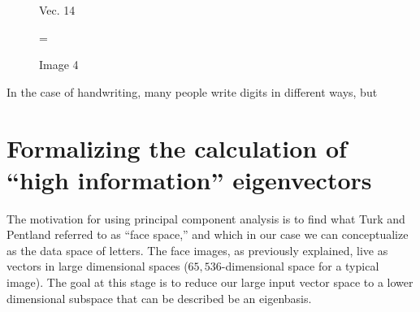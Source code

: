 \documentclass[12pt]{report}
\begin{document}
\begin{figure}[H]
                \begin{minipage}{0.1\textwidth}
                    \centering
                    Vec. 14
                \end{minipage}
                \begin{minipage}{0.035\textwidth}
                    \centering
                    \quad=\quad
                \end{minipage}
                \begin{minipage}{0.1\textwidth}
                    \centering
                    Image 4
                \end{minipage}%
            \end{figure}

            In the case of handwriting, many people write digits in different ways, but 
                
        
        \section{Formalizing the calculation of ``high information'' eigenvectors}
            The motivation for using principal component analysis is to find what Turk and Pentland referred to as ``face space,'' and which in our case we can conceptualize as the data space of letters. The face images, as previously explained, live as vectors in large dimensional spaces ($65,536$-dimensional  space for a typical image). The goal at this stage is to reduce our large input vector space to a lower dimensional subspace that can be described be an eigenbasis.  
    
\end{document}
